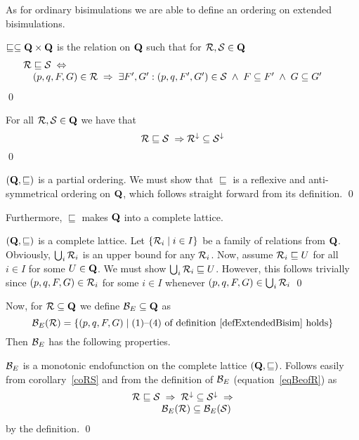 As for ordinary bisimulations we are able to define an ordering on extended bisimulations.
\begin{definition}
$\sqsubseteq\subseteq \hbox{\bf Q}\times \hbox{\bf Q}$ is the relation on $\hbox{\bf Q}$ such that for ${\cal R}, {\cal S}\in \hbox{\bf Q}$
\[
\begin{array}{llll}
\multicolumn{4}{l}{{\cal R}\sqsubseteq{\cal S}\;\Leftrightarrow}\\
&(p,q,F,G)\in{\cal R}\;\Rightarrow\;\exists F',G':(p,q,F',G')\in{\cal S}\;\wedge\;F\subseteq F'\;\wedge\;G\subseteq G'&&
\end{array}
\]
\qed
\end{definition}
\begin{corollary}\label{coRS}
For all ${\cal R}, {\cal S} \in \hbox{\bf Q}$ we have that
\[
{\cal R}\sqsubseteq{\cal S}\;\Rightarrow {\cal R}^{\downarrow}\subseteq{\cal S}^{\downarrow}
\]
\qed
\end{corollary}
\begin{proposition}
$(\hbox{\bf Q},\sqsubseteq)$ is a partial ordering.
\proof We must show that $\sqsubseteq$ is a reflexive and anti-symmetrical ordering on $\hbox{\bf Q}$, which follows straight forward from its definition.
\qed
\end{proposition}
Furthermore, $\sqsubseteq$ makes $\hbox{\bf Q}$ into a complete lattice.
\begin{proposition}
$(\hbox{\bf Q},\sqsubseteq)$ is a complete lattice.
\proof Let $\{{\cal R}_i\mid i\in I\}$ be a family of relations from $\hbox{\bf Q}$. Obviously, $\bigcup_i{\cal R}_i$ is an upper bound for any ${\cal R}_i$. Now, assume ${\cal R}_i\sqsubseteq U$ for all $i\in I$ for some $U\in \hbox{\bf Q}$. We must show $\bigcup_i{\cal R}_i\sqsubseteq U$. However, this follows trivially since $(p,q,F,G)\in{\cal R}_i$ for some $i\in I$ whenever $(p,q,F,G)\in\bigcup_i{\cal R}_i$
\qed
\end{proposition}
Now, for ${\cal R}\subseteq \hbox{\bf Q}$ we define ${\cal B}_E\subseteq \hbox{\bf Q}$ as
\begin{equation}\label{eqBeofR}
{\cal B}_E({\cal R}) = \{(p,q,F,G)\mid \mbox{(1)--(4) of definition~\ref{defExtendedBisim} holds}\}
\end{equation}
Then ${\cal B}_E$ has the following properties.
\begin{proposition}
${\cal B}_E$ is a monotonic endofunction on the complete lattice $(\hbox{\bf Q},\sqsubseteq)$.
\proof Follows easily from corollary~\ref{coRS} and from the definition of ${\cal B}_E$ (equation~\ref{eqBeofR}) as
\[
\begin{array}{llll}
\multicolumn{4}{l}{{\cal R}\sqsubseteq{\cal S}\;\Rightarrow\;{\cal R}^{\downarrow}\subseteq{\cal S}^{\downarrow}\;\Rightarrow}\\
&&&{\cal B}_E({\cal R})\subseteq {\cal B}_E({\cal S})
\end{array}
\]
by the definition.
\qed
\end{proposition}
